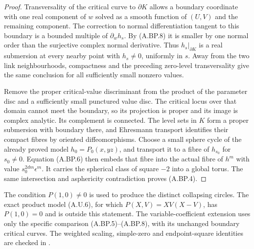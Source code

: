 \begin{proof}
Transversality of the critical curve to $\partial K$
allows a boundary coordinate with one real component
of $w$ solved as a smooth function of $(U,V)$ and
the remaining component. The correction to normal
differentiation tangent to this boundary is a
bounded multiple of $\partial_w h_s$.
By (A.BP.8) it is smaller by one normal order than
the surjective complex normal derivative. Thus
$h_s|_{\partial K}$ is a real submersion at every
nearby point with $h_s\ne0$, uniformly in $s$.
Away from the two link neighbourhoods, compactness
and the preceding zero-level transversality give
the same conclusion for all sufficiently small
nonzero values.

Remove the proper critical-value discriminant from
the product of the parameter disc and a sufficiently
small punctured value disc. The critical locus over
that domain cannot meet the boundary, so its
projection is proper and its image is complex
analytic. Its complement is connected. The level
sets in $K$ form a proper submersion with boundary
there, and Ehresmann transport identifies their
compact fibres by oriented diffeomorphisms.
Choose a small sphere cycle of the already proved
model $h_0=P_0(x,yz)$, and transport it to a fibre
of $h_{s_0}$ for $s_0\ne0$. Equation (A.BP.6)
then embeds that fibre into the actual fibre
of $h^m$ with value $s_0^{2dm}\epsilon^m$.
It carries the spherical class of square $-2$
into a global torus. The same intersection and
asphericity contradiction proves (A.BP.4).
\end{proof}

The condition $P(1,0)\ne0$ is used to produce the
distinct collapsing circles. The exact product
model (A.U.6), for which $P(X,V)=XV(X-V)$, has
$P(1,0)=0$ and is outside this statement.
The variable-coefficient extension uses only the
specific comparison (A.BP.5)--(A.BP.8), with its
unchanged boundary critical curves. The weighted scaling,
simple-zero and endpoint-square identities are
checked in .

